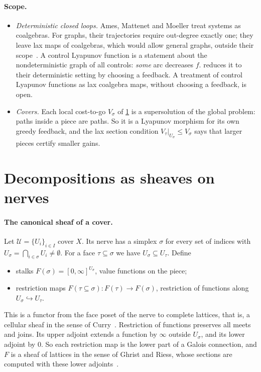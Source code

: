 \documentclass[11pt]{article}
\theoremstyle{definition}
\theoremstyle{remark}
\begin{document}
\paragraph{Scope.}
\begin{itemize}
\item \emph{Deterministic closed loops.} Ames, Mattenet and Moeller treat systems
  as coalgebras. For graphs, their trajectories require out-degree exactly one;
  they leave lax maps of coalgebras, which would allow general graphs, outside
  their scope~\cite{ames2025clt2}. A control Lyapunov function is a statement
  about the nondeterministic graph of all controls: \emph{some} arc decreases $f$.
   reduces it to their deterministic setting by choosing a
  feedback. A treatment of control Lyapunov functions as lax coalgebra maps,
  without choosing a feedback, is open.
\item \emph{Covers.} Each local cost-to-go $V_\sigma$ of \cref{sec:sheaves} is a
  supersolution of the global problem: paths inside a piece are paths. So it is a
  Lyapunov morphism for its own greedy feedback, and the lax section condition
  $V_\tau|_{U_\sigma} \le V_\sigma$ says that larger pieces certify smaller gains.
\end{itemize}

\section{Decompositions as sheaves on nerves}\label{sec:sheaves}

\paragraph{The canonical sheaf of a cover.}
Let $\mathcal U = \{U_i\}_{i\in I}$ cover $X$. Its nerve has a simplex $\sigma$ for
every set of indices with $U_\sigma = \bigcap_{i\in\sigma} U_i \ne \emptyset$. For
a face $\tau \subseteq \sigma$ we have $U_\sigma \subseteq U_\tau$. Define
\begin{itemize}[nosep]
\item stalks $F(\sigma) = [0,\infty]^{U_\sigma}$, value functions on the piece;
\item restriction maps $F(\tau \subseteq \sigma) : F(\tau) \to F(\sigma)$,
  restriction of functions along $U_\sigma \hookrightarrow U_\tau$.
\end{itemize}
This is a functor from the face poset of the nerve to complete lattices, that is,
a cellular sheaf in the sense of Curry~\cite{curry2014}. Restriction of functions
preserves all meets and joins. Its upper adjoint extends a function by $\infty$
outside $U_\sigma$, and its lower adjoint by $0$. So each restriction map is the
lower part of a Galois connection, and $F$ is a sheaf of lattices in the sense of
Ghrist and Riess, whose sections are computed with these lower
adjoints~\cite{ghrist2022}.
\end{document}
